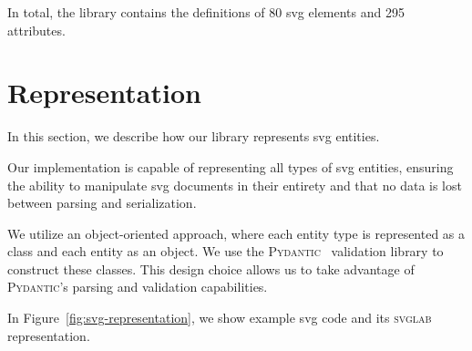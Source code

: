 In total, the library contains the definitions of 80 \gls{svg} elements and 295 attributes.

\section{Representation}\label{impl:representation}

In this section, we describe how our library represents \gls{svg} entities.

Our implementation is capable of representing all types of \gls{svg} entities, ensuring the ability to manipulate \gls{svg} documents in their entirety and that no data is lost between parsing and serialization.

We utilize an object-oriented approach, where each entity type is represented as a class and each entity as an object. We use the \textsc{Pydantic}~\cite{pydantic} validation library to construct these classes. This design choice allows us to take advantage of \textsc{Pydantic}'s parsing and validation capabilities.

In Figure~\ref{fig:svg-representation}, we show example \gls{svg} code and its \textsc{svglab} representation.

